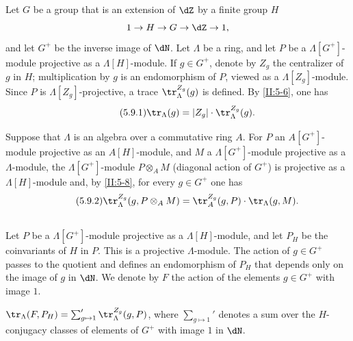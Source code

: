 \documentclass[oneside]{book}
\begin{document}
\subsection{}\label{II:5-9}

Let $G$ be a group that is an extension of $\dZ$ by a finite group $H$
\[
  1 \to H \to G \to \dZ \to 1 \text{,}
\]
and let $G^+$ be the inverse image of $\dN$. Let $\Lambda$ be a ring, and let
$P$ be a $\Lambda[G^+]$-module projective as a $\Lambda[H]$-module. If
$g\in G^+$, denote by $Z_g$ the centralizer of $g$ in $H$; multiplication by
$g$ is an endomorphism of $P$, viewed as a $\Lambda[Z_g]$-module. Since $P$
is $\Lambda[Z_g]$-projective, a trace $\tr_\Lambda^{Z_g}(g)$ is defined. By
\ref{II:5-6}, one has
\begin{equation*}\tag{5.9.1}\label{II:eq:5-9-1}
  \tr_\Lambda(g) = |Z_g| \cdot \tr_\Lambda^{Z_g}(g) \text{.}
\end{equation*}

Suppose that $\Lambda$ is an algebra over a commutative ring $A$. For $P$ an
$A[G^+]$-module projective as an $A[H]$-module, and $M$ a
$\Lambda[G^+]$-module projective as a $\Lambda$-module, the
$\Lambda[G^+]$-module $P\otimes_A M$ (diagonal action of $G^+$) is projective
as a $\Lambda[H]$-module and, by \ref{II:5-8}, for every $g\in G^+$ one has
\begin{equation*}\tag{5.9.2}\label{II:eq:5-9-2}
  \tr_\Lambda^{Z_g}(g,P\otimes_A M) = \tr_A^{Z_g}(g,P) \cdot \tr_\Lambda(g,M) \text{.}
\end{equation*}






\subsection{}\label{II:5-10}

Let $P$ be a $\Lambda[G^+]$-module projective as a $\Lambda[H]$-module, and
let $P_H$ be the coinvariants of $H$ in $P$. This is a projective
$\Lambda$-module. The action of $g\in G^+$ passes to the quotient and defines
an endomorphism of $P_H$ that depends only on the image of $g$ in $\dN$. We
denote by $F$ the action of the elements $g\in G^+$ with image $1$.






\begin{proposition_}\label{II:5-11}
$\tr_\Lambda(F,P_H) = \sum_{g\mapsto 1}' \tr_\Lambda^{Z_g}(g,P)$, where
$\sum_{g\mapsto 1}'$ denotes a sum over the $H$-conjugacy classes of elements
of $G^+$ with image $1$ in $\dN$.
\end{proposition_}
\end{document}
